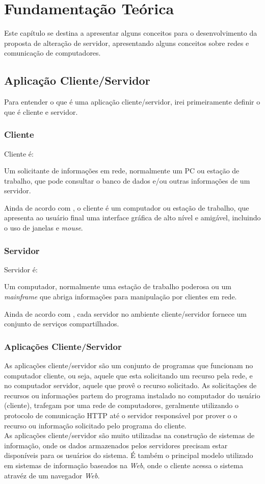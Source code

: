\chapter{Fundamentação Teórica}\label{fundamentacao-teorica}
Este capítulo se destina a apresentar alguns conceitos para o desenvolvimento da proposta de alteração de servidor, apresentando alguns conceitos sobre redes e comunicação de computadores.

\section{Aplicação Cliente/Servidor}
Para entender o que é uma aplicação cliente/servidor, irei primeiramente definir o que é cliente e servidor.
\subsection{Cliente}
Cliente é:
\begin{citacao}
Um solicitante de informações em rede, normalmente um PC ou estação de trabalho, que pode consultar o banco de dados e/ou outras informações de um servidor. \cite{stallings2005}
\end{citacao}
Ainda de acordo com , o cliente é um computador ou estação de trabalho, que apresenta ao usuário final uma interface gráfica de alto nível e amigável, incluindo o uso de janelas e \textit{mouse}. 
\subsection{Servidor}
Servidor é:
\begin{citacao}
Um computador, normalmente uma estação de trabalho poderosa ou um \textit{mainframe} que abriga informações para manipulação por clientes em rede. \cite{stallings2005}
\end{citacao}
Ainda de acordo com , cada servidor no ambiente cliente/servidor fornece um conjunto de serviços compartilhados.
\subsection{Aplicações Cliente/Servidor}
As aplicações cliente/servidor são um conjunto de programas que funcionam no computador cliente, ou seja, aquele que esta solicitando um recurso pela rede, e no computador servidor, aquele que provê o recurso solicitado. As solicitações de recursos ou informações partem do programa instalado no computador do usuário (cliente), trafegam por uma rede de computadores, geralmente utilizando o protocolo de comunicação HTTP até o servidor responsável por prover o o recurso ou informação solicitado pelo programa do cliente.\\
As aplicações cliente/servidor são muito utilizadas na construção de sistemas de informação, onde os dados armazenados pelos servidores precisam estar disponíveis para os usuários do sistema. É também o principal modelo utilizado em sistemas de informação baseados na \textit{Web}, onde o cliente acessa o sistema atravéz de um navegador \textit{Web}.

